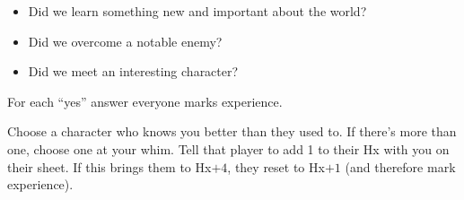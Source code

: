 \begin{itemize}
\item Did we learn something new and important about the world?
\item Did we overcome a notable enemy?
\item Did we meet an interesting character?
\end{itemize}

For each ``yes'' answer everyone marks experience.

Choose a character who knows you better than they used to. If there's
more than one, choose one at your whim. Tell that player to add 1 to
their Hx with you on their sheet. If this brings them to Hx$+4$, they
reset to Hx$+1$ (and therefore mark experience).
